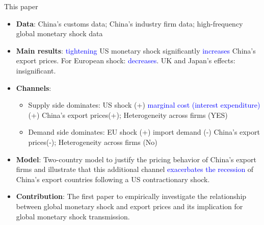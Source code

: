 \documentclass[10pt]{beamer}
\begin{document}
\begin{frame}{This paper}
\begin{itemize}
\item \textbf{Data}: China's customs data;  China's industry firm data; high-frequency global monetary shock data 
\item \textbf{Main results}: \textcolor{blue}{tightening} US monetary shock significantly \textcolor{blue}{increases} China's export prices. For European shock: \textcolor{blue}{decreases}. UK and Japan's effects: insignificant. 
\item \textbf{Channels}: 
\begin{itemize}
    \item Supply side dominates: US shock (+) \textcolor{blue}{marginal cost (interest expenditure)} (+) China's export prices(+); Heterogeneity across firms (YES)
    \item Demand side dominates: EU shock (+) import demand (-) China's export prices(-); Heterogeneity across firms (No)
\end{itemize} 
\item \textbf{Model}: Two-country model to justify the pricing behavior of China's export firms and illustrate that this additional channel \textcolor{blue}{exacerbates the recession} of China's export countries following a US contractionary shock.
\item \textbf{Contribution}: The first paper to empirically investigate the relationship between global monetary shock and export prices and its implication for global monetary shock transmission. 
\end{itemize}

\end{frame}
\end{document}
